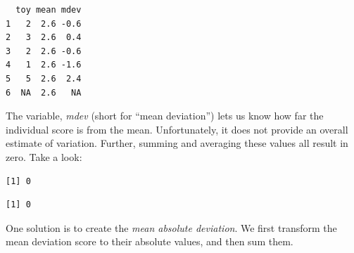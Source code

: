 \documentclass[
  11pt,
]{book}
\newenvironment{Shaded}{\begin{snugshade}}{\end{snugshade}}
\newcommand{\AttributeTok}[1]{\textcolor[rgb]{0.77,0.63,0.00}{#1}}
\newcommand{\CommentTok}[1]{\textcolor[rgb]{0.56,0.35,0.01}{\textit{#1}}}
\newcommand{\ConstantTok}[1]{\textcolor[rgb]{0.00,0.00,0.00}{#1}}
\newcommand{\DecValTok}[1]{\textcolor[rgb]{0.00,0.00,0.81}{#1}}
\newcommand{\FunctionTok}[1]{\textcolor[rgb]{0.00,0.00,0.00}{#1}}
\newcommand{\NormalTok}[1]{#1}
\newcommand{\OtherTok}[1]{\textcolor[rgb]{0.56,0.35,0.01}{#1}}
\newcommand{\SpecialCharTok}[1]{\textcolor[rgb]{0.00,0.00,0.00}{#1}}
\begin{document}
\begin{verbatim}
  toy mean mdev
1   2  2.6 -0.6
2   3  2.6  0.4
3   2  2.6 -0.6
4   1  2.6 -1.6
5   5  2.6  2.4
6  NA  2.6   NA
\end{verbatim}

The variable, \emph{mdev} (short for ``mean deviation'') lets us know how far the individual score is from the mean. Unfortunately, it does not provide an overall estimate of variation. Further, summing and averaging these values all result in zero. Take a look:

\begin{Shaded}
\end{Shaded}

\begin{verbatim}
[1] 0
\end{verbatim}

\begin{Shaded}
\end{Shaded}

\begin{verbatim}
[1] 0
\end{verbatim}

One solution is to create the \emph{mean absolute deviation}. We first transform the mean deviation score to their absolute values, and then sum them.

\begin{Shaded}
\end{Shaded}
\end{document}
